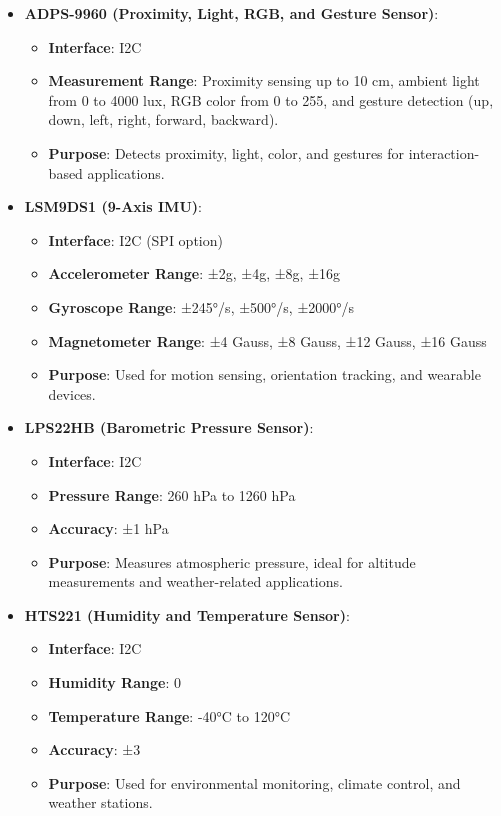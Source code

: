	\begin{itemize}
		\item \textbf{ADPS-9960 (Proximity, Light, RGB, and Gesture Sensor)}:
		\begin{itemize}
			\item \textbf{Interface}: I2C
			\item \textbf{Measurement Range}: Proximity sensing up to 10 cm, ambient light from 0 to 4000 lux, RGB color from 0 to 255, and gesture detection (up, down, left, right, forward, backward).
			\item \textbf{Purpose}: Detects proximity, light, color, and gestures for interaction-based applications.
		\end{itemize}
		
		\item \textbf{LSM9DS1 (9-Axis IMU)}:
		\begin{itemize}
			\item \textbf{Interface}: I2C (SPI option)
			\item \textbf{Accelerometer Range}: ±2g, ±4g, ±8g, ±16g
			\item \textbf{Gyroscope Range}: ±245°/s, ±500°/s, ±2000°/s
			\item \textbf{Magnetometer Range}: ±4 Gauss, ±8 Gauss, ±12 Gauss, ±16 Gauss
			\item \textbf{Purpose}: Used for motion sensing, orientation tracking, and wearable devices.
		\end{itemize}
		
		\item \textbf{LPS22HB (Barometric Pressure Sensor)}:
		\begin{itemize}
			\item \textbf{Interface}: I2C
			\item \textbf{Pressure Range}: 260 hPa to 1260 hPa
			\item \textbf{Accuracy}: ±1 hPa
			\item \textbf{Purpose}: Measures atmospheric pressure, ideal for altitude measurements and weather-related applications.
		\end{itemize}
		
		\item \textbf{HTS221 (Humidity and Temperature Sensor)}:
		\begin{itemize}
			\item \textbf{Interface}: I2C
			\item \textbf{Humidity Range}: 0%
			\item \textbf{Temperature Range}: -40°C to 120°C
			\item \textbf{Accuracy}: ±3%
			\item \textbf{Purpose}: Used for environmental monitoring, climate control, and weather stations.
		\end{itemize}
		

\end{itemize}
